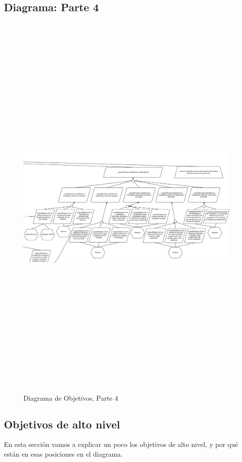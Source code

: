 \documentclass[a4paper, 10pt, twoside]{article}
\begin{document}
\subsection{Diagrama: Parte 4}
\begin{figure}[H]
  \includegraphics[angle=90,height=20cm]{diagramas/diagrama-objetivos-3.png}
  \caption{Diagrama de Objetivos, Parte 4}
  \label{fig:diagrama-objetivos-3}
\end{figure}
\newpage

\subsection{Objetivos de alto nivel}

En esta sección vamos a explicar un poco los objetivos de alto nivel, y por qué están en esas posiciones en el diagrama.
\end{document}
